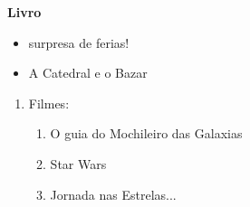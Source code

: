 \LARGE {\huge \textbf{Livro}}

\begin{itemize}
	\item \huge surpresa de ferias!

\item \huge A Catedral e o Bazar

\end{itemize}


\begin{enumerate}
	\item {\huge Filmes}:

\begin{enumerate}
\Large	\item  O guia do Mochileiro das Galaxias
	\item \huge Star Wars
	\item \huge Jornada nas Estrelas...
\end{enumerate}
\end{enumerate}
